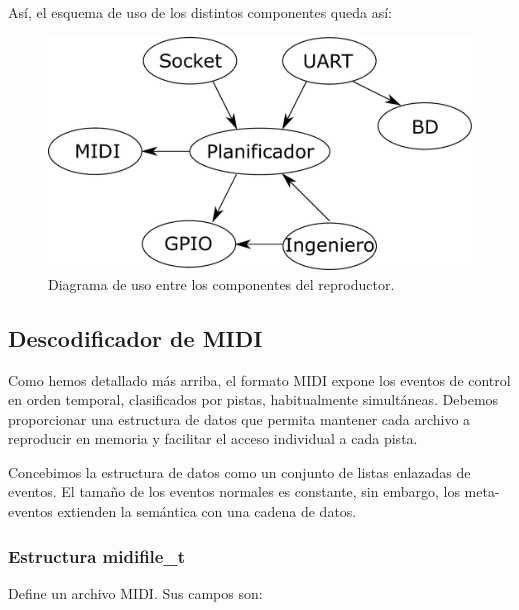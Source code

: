 Así, el esquema de uso de los distintos componentes queda así:

\smallskip

\begin{figure}[H]
	\noindent \begin{centering}
		\includegraphics[width=\linewidth/2]{capitulo4/daemon}
		\par\end{centering}
	\smallskip
	\caption{\label{fig:daemon} Diagrama de uso entre los componentes del reproductor.}
\end{figure} 

\smallskip

\subsection{Descodificador de MIDI}
\label{subsec:daemon_midi}

Como hemos detallado más arriba, el formato \acrshort{MIDI} expone los eventos de control en orden temporal, clasificados por pistas, habitualmente simultáneas. Debemos proporcionar una estructura de datos que permita mantener cada archivo a reproducir en memoria y facilitar el acceso individual a cada pista.

Concebimos la estructura de datos como un conjunto de listas enlazadas de eventos. El tamaño de los eventos normales es constante, sin embargo, los meta-eventos extienden la semántica con una cadena de datos.

\subsubsection{Estructura midifile\_t}

Define un archivo \acrshort{MIDI}. Sus campos son:

